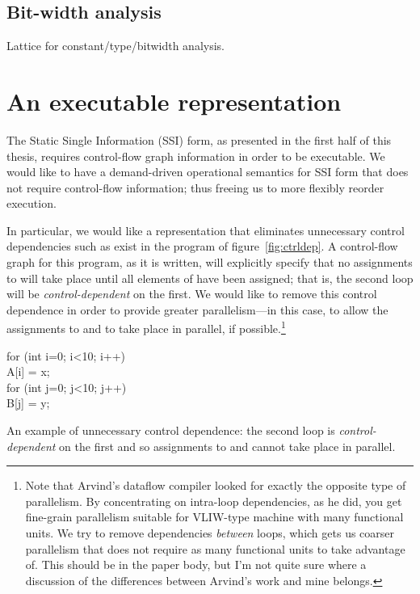 \documentclass[12pt,titlepage,twoside]{article}
\newcommand*{\figscale}{1.0}
\let\oldsection\section
\renewcommand{\section}{\setcounter{figure}{0}\oldsection}
\begin{document}
\subsection{Bit-width analysis}\label{sec:bitwidth}

\begin{myfigure}[t]
\centering\renewcommand*{\figscale}{0.6}
\caption{Lattice for constant/type/bitwidth analysis.}
\label{fig:lattice}
\end{myfigure}

\section{An executable representation}\label{sec:ssiplus}
The Static Single Information (SSI) form, as presented in the first
half of this thesis,
requires control-flow graph information in order to be executable. We
would like to have a demand-driven operational semantics for SSI form
that does not require control-flow information; thus freeing us to
more flexibly reorder execution.

In particular, we would like a representation that eliminates
unnecessary control dependencies such as exist in the program of
figure~\vref{fig:ctrldep}.  A control-flow graph for this program, as
it is written, will explicitly specify that no assignments to
 will take place until all elements of  have
been assigned; that is, the second loop will be
\emph{control-dependent} on the first.  We would like to remove this
control dependence in order to provide greater parallelism---in this
case, to allow the assignments to  and  to
take place in parallel, if possible.\footnote{Note that Arvind's
dataflow compiler \cite{traub86:ttda} looked for exactly the opposite type of
parallelism.  By concentrating on intra-loop dependencies, as he did, you get
fine-grain parallelism suitable for VLIW-type machine with many
functional units.  We try to remove dependencies \emph{between} loops,
which gets us coarser parallelism that does not require as many
functional units to take advantage of.  This should be in the paper
body, but I'm not quite sure where a discussion of the differences
between Arvind's work and mine belongs.}

\begin{myfigure}[t]
\begin{samplecode}
for (int i=0; i<10; i++)\\
\>A[i] = x;\\
for (int j=0; j<10; j++)\\
\>B[j] = y;\\
\end{samplecode}
\caption[An example of unnecessary control dependence.]
{An example of unnecessary control dependence: the second loop
is \emph{control-dependent} on the first and so assignments to
 and  cannot take place in parallel.}
\label{fig:ctrldep}
\end{myfigure}
\end{document}
